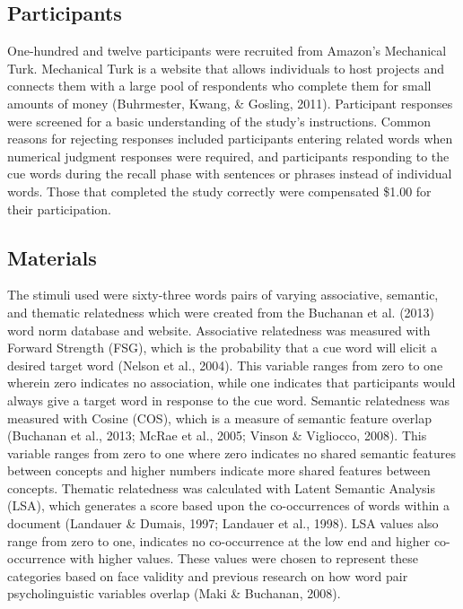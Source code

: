 \documentclass[english,man]{apa6}
\theoremstyle{definition}
\theoremstyle{definition}
\theoremstyle{definition}
\theoremstyle{remark}
\begin{document}
\subsection{Participants}\label{participants}

One-hundred and twelve participants were recruited from Amazon's
Mechanical Turk. Mechanical Turk is a website that allows individuals to
host projects and connects them with a large pool of respondents who
complete them for small amounts of money (Buhrmester, Kwang, \& Gosling,
2011). Participant responses were screened for a basic understanding of
the study's instructions. Common reasons for rejecting responses
included participants entering related words when numerical judgment
responses were required, and participants responding to the cue words
during the recall phase with sentences or phrases instead of individual
words. Those that completed the study correctly were compensated \$1.00
for their participation.

\subsection{Materials}\label{materials}

The stimuli used were sixty-three words pairs of varying associative,
semantic, and thematic relatedness which were created from the Buchanan
et al. (2013) word norm database and website. Associative relatedness
was measured with Forward Strength (FSG), which is the probability that
a cue word will elicit a desired target word (Nelson et al., 2004). This
variable ranges from zero to one wherein zero indicates no association,
while one indicates that participants would always give a target word in
response to the cue word. Semantic relatedness was measured with Cosine
(COS), which is a measure of semantic feature overlap (Buchanan et al.,
2013; McRae et al., 2005; Vinson \& Vigliocco, 2008). This variable
ranges from zero to one where zero indicates no shared semantic features
between concepts and higher numbers indicate more shared features
between concepts. Thematic relatedness was calculated with Latent
Semantic Analysis (LSA), which generates a score based upon the
co-occurrences of words within a document (Landauer \& Dumais, 1997;
Landauer et al., 1998). LSA values also range from zero to one,
indicates no co-occurrence at the low end and higher co-occurrence with
higher values. These values were chosen to represent these categories
based on face validity and previous research on how word pair
psycholinguistic variables overlap (Maki \& Buchanan, 2008).
\end{document}
